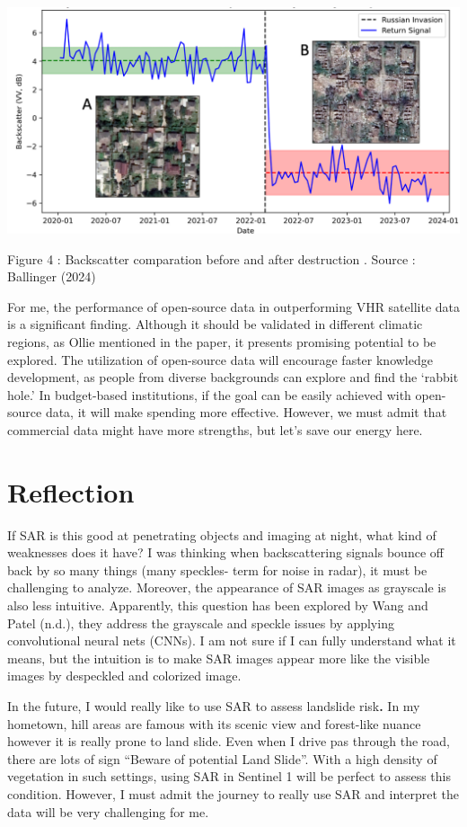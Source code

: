\documentclass[
  letterpaper,
  DIV=11,
  numbers=noendperiod]{scrreprt}
\begin{document}
\includegraphics[width=5.60417in,height=\textheight]{images/clipboard-2990756776.png}

Figure 4 : Backscatter comparation before and after destruction . Source
: Ballinger (2024)

For me, the performance of open-source data in outperforming VHR
satellite data is a significant finding. Although it should be validated
in different climatic regions, as Ollie mentioned in the paper, it
presents promising potential to be explored. The utilization of
open-source data will encourage faster knowledge development, as people
from diverse backgrounds can explore and find the `rabbit hole.' In
budget-based institutions, if the goal can be easily achieved with
open-source data, it will make spending more effective. However, we must
admit that commercial data might have more strengths, but let's save our
energy here.

\hypertarget{reflection-5}{%
\section{Reflection}\label{reflection-5}}

If SAR is this good at penetrating objects and imaging at night, what
kind of weaknesses does it have? I was thinking when backscattering
signals bounce off back by so many things (many speckles- term for noise
in radar), it must be challenging to analyze. Moreover, the appearance
of SAR images as grayscale is also less intuitive. Apparently, this
question has been explored by Wang and Patel (n.d.), they address the
grayscale and speckle issues by applying convolutional neural nets
(CNNs). I am not sure if I can fully understand what it means, but the
intuition is to make SAR images appear more like the visible images by
despeckled and colorized image.

In the future, I would really like to use SAR to assess landslide
risk\textbf{.} In my hometown, hill areas are famous with its scenic
view and forest-like nuance however it is really prone to land slide.
Even when I drive pas through the road, there are lots of sign ``Beware
of potential Land Slide''. With a high density of vegetation in such
settings, using SAR in Sentinel 1 will be perfect to assess this
condition. However, I must admit the journey to really use SAR and
interpret the data will be very challenging for me.
\end{document}
